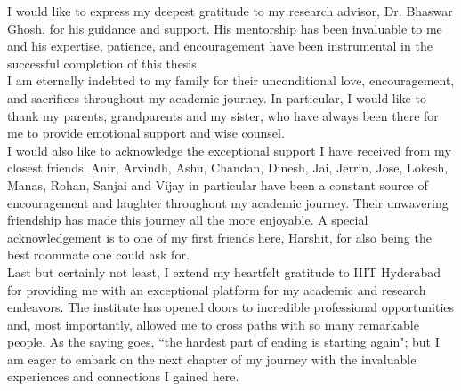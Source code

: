 I would like to express my deepest gratitude to my research advisor, Dr. Bhaswar Ghosh, for his 
guidance and support. His mentorship has been invaluable to me and his expertise, patience, and 
encouragement have been instrumental in the successful completion of this thesis. \\

I am eternally indebted to my family for their unconditional love, encouragement, and sacrifices 
throughout my academic journey. In particular, I would like to thank my parents, grandparents and my sister, 
who have always been there for me to provide emotional support and wise counsel. \\

I would also like to acknowledge the exceptional support I have received from my closest friends. 
Anir, Arvindh, Ashu, Chandan, Dinesh, Jai, Jerrin, Jose, Lokesh, Manas, Rohan, Sanjai and Vijay in particular
have been a constant source of encouragement and laughter throughout my academic journey. 
Their unwavering friendship has made this journey all the more enjoyable. A special acknowledgement is to 
one of my first friends here, Harshit, for also being the best roommate one could ask for. \\

Last but certainly not least, I extend my heartfelt gratitude to IIIT Hyderabad for providing me with an 
exceptional platform for my academic and research endeavors. The institute has opened doors to incredible 
professional opportunities and, most importantly, allowed me to cross paths with so many remarkable people. 
As the saying goes, ``the hardest part of ending is starting again"; but I am eager to embark on the next 
chapter of my journey with the invaluable experiences and connections I gained here.
